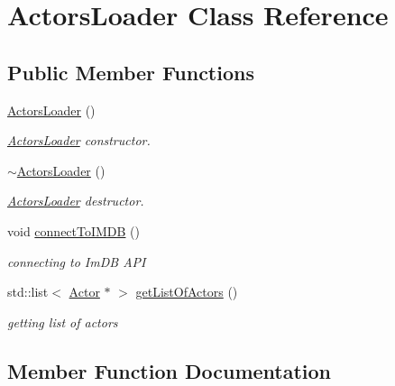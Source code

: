 \hypertarget{classActorsLoader}{}\section{Actors\+Loader Class Reference}
\label{classActorsLoader}
\subsection*{Public Member Functions}
\begin{DoxyCompactItemize}
\item 
\mbox{\label{classActorsLoader_a130deecc6b389e7dfe1a1ee6a4b0ab9f}} 
\hyperlink{classActorsLoader_a130deecc6b389e7dfe1a1ee6a4b0ab9f}{Actors\+Loader} ()
\begin{DoxyCompactList}\small\item\em \hyperlink{classActorsLoader}{Actors\+Loader} constructor. \end{DoxyCompactList}\item 
\mbox{\label{classActorsLoader_a36b062dd3ec38eb064570972b60bf0e7}} 
\hyperlink{classActorsLoader_a36b062dd3ec38eb064570972b60bf0e7}{$\sim$\+Actors\+Loader} ()
\begin{DoxyCompactList}\small\item\em \hyperlink{classActorsLoader}{Actors\+Loader} destructor. \end{DoxyCompactList}\item 
\mbox{\label{classActorsLoader_af6cd0bc5b9b13e194f419564bca8f082}} 
void \hyperlink{classActorsLoader_af6cd0bc5b9b13e194f419564bca8f082}{connect\+To\+I\+M\+DB} ()
\begin{DoxyCompactList}\small\item\em connecting to Im\+DB A\+PI \end{DoxyCompactList}\item 
std\+::list$<$ \hyperlink{classActor}{Actor} $\ast$ $>$ \hyperlink{classActorsLoader_a874dc64afbddc3d49182139c6f3c2510}{get\+List\+Of\+Actors} ()
\begin{DoxyCompactList}\small\item\em getting list of actors \end{DoxyCompactList}\end{DoxyCompactItemize}


\subsection{Member Function Documentation}
\mbox{\label{classActorsLoader_a874dc64afbddc3d49182139c6f3c2510}} 
